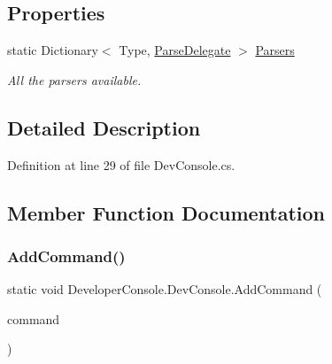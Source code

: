 \subsection*{Properties}
\begin{DoxyCompactItemize}
\item 
static Dictionary$<$ Type, \hyperlink{namespace_developer_console_a62e10d7e4aeed7c6bcd4a780468c74fa}{Parse\+Delegate} $>$ \hyperlink{class_developer_console_1_1_dev_console_aacf3a497357bcc16ce4bbb9428472136}{Parsers}
\begin{DoxyCompactList}\small\item\em All the parsers available. \end{DoxyCompactList}\end{DoxyCompactItemize}


\subsection{Detailed Description}


Definition at line 29 of file Dev\+Console.\+cs.



\subsection{Member Function Documentation}
\mbox{\label{class_developer_console_1_1_dev_console_a32e63d4fd5d3f05fea53a818c87dd52c}} 
\subsubsection{\texorpdfstring{Add\+Command()}{AddCommand()}}
{\footnotesize\ttfamily static void Developer\+Console.\+Dev\+Console.\+Add\+Command (\begin{DoxyParamCaption}\item[{\hyperlink{class_developer_console_1_1_core_1_1_command_base}{Command\+Base}}]{command }\end{DoxyParamCaption})\hspace{0.3cm}{\ttfamily [static]}}



